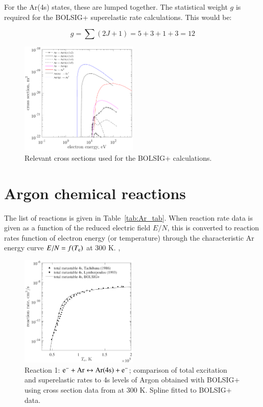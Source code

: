 \documentclass{warpdoc}
\begin{document}
For the Ar(4s) states, these are lumped together. The statistical weight $g$ is required for the BOLSIG+ superelastic rate calculations. This would be:

$$g = \sum (2J+1) = 5 + 3 + 1 + 3 = 12$$

\begin{figure}[ht]
     \centering
     \includegraphics[width=0.5\textwidth]{figs/cs.pdf}
     \caption{Relevant cross sections used for the BOLSIG+ calculations.}
     \label{fig:cs_Ar}
\end{figure}


\section{Argon chemical reactions}

 The list of reactions is given in Table~\ref{tab:Ar_tab}. When reaction rate data is given as a function of the reduced electric field $E/N$, this is converted to reaction rates function of electron energy (or temperature) through the characteristic Ar energy curve $E/N = f(T_{\rm e})$ at 300 K. \cite{ijae:2011:katsonis}, \cite{jap:1993:lymberopoulos}

\begin{figure}[ht]
     \centering
     \includegraphics[width=0.5\textwidth]{figs/reaction1.pdf}
     \caption{Reaction 1: $\rm e^- + Ar \leftrightarrow Ar(4s) + e^-$; comparison of total excitation and superelastic rates to 4s levels of Argon obtained with BOLSIG+ using cross section data from \cite{pr:tachibana:1986} at 300 K. Spline fitted to BOLSIG+ data.}
     \label{fig:rate_R1}
\end{figure}
\end{document}

